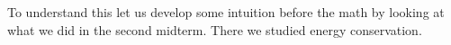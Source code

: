 \documentclass[%
oneside,                 %
final,                   %
10pt]{article}
\begin{document}
To understand this let us develop some intuition before the math by looking at what we did in the second midterm. There we studied energy conservation.
\end{document}
